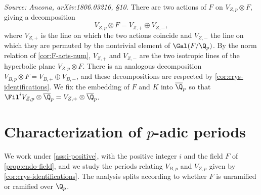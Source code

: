 \begin{remark}
  \label{rem:conventionF}
  \textit{Source: Ancona, arXiv:1806.03216, \S10.}
  There are two actions of \(F\) on \(V_{Z,p} \otimes F\), giving a
  decomposition
  \[V_{Z,p} \otimes F = V_{Z,+} \oplus V_{Z,-},\]
  where \(V_{Z,+}\) is the line on which the two actions coincide and \(V_{Z,-}\)
  the line on which they are permuted by the nontrivial element of
  \(\Gal(F/\Q_p)\). By the norm relation of \cref{cor:F-acts-num}, \(V_{Z,+}\) and \(V_{Z,-}\) are the two
  isotropic lines of the hyperbolic plane \(V_{Z,p} \otimes F\). There is an
  analogous decomposition \(V_{B,p} \otimes F = V_{B,+} \oplus V_{B,-}\), and
  these decompositions are respected by \cref{cor:crys-identifications}. We fix
  the embedding of \(F\) and \(K\) into \(\overline{\Q}_p\) so that
  \(\Fil^i V_{Z,p} \otimes \overline{\Q}_p = V_{Z,+} \otimes \overline{\Q}_p\).
\end{remark}

\section{Characterization of $p$-adic periods}
\label{sec:padic-periods}

We work under \cref{ass:i-positive}, with the positive integer \(i\) and the
field \(F\) of \cref{prop:endo-field}, and we study the periods relating
\(V_{B,p}\) and \(V_{Z,p}\) given by \cref{cor:crys-identifications}. The
analysis splits according to whether \(F\) is unramified or ramified over
\(\Q_p\).

